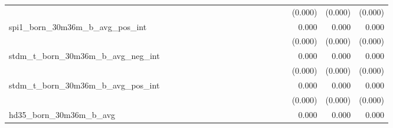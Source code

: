 \begin{tabular}{lrrrrrrrrrrrrrrrrrr}
                                            &              &              &              &              &              &              &              &              &               &              &              &               &              &              &               &      (0.000) &      (0.000) &       (0.000) \\ 
spi1\_born\_30m36m\_b\_avg\_pos\_int        &              &              &              &              &              &              &              &              &               &              &              &               &              &              &               &        0.000 &        0.000 &         0.000 \\ 
                                            &              &              &              &              &              &              &              &              &               &              &              &               &              &              &               &      (0.000) &      (0.000) &       (0.000) \\ 
stdm\_t\_born\_30m36m\_b\_avg\_neg\_int     &              &              &              &              &              &              &              &              &               &              &              &               &              &              &               &        0.000 &        0.000 &         0.000 \\ 
                                            &              &              &              &              &              &              &              &              &               &              &              &               &              &              &               &      (0.000) &      (0.000) &       (0.000) \\ 
stdm\_t\_born\_30m36m\_b\_avg\_pos\_int     &              &              &              &              &              &              &              &              &               &              &              &               &              &              &               &        0.000 &        0.000 &         0.000 \\ 
                                            &              &              &              &              &              &              &              &              &               &              &              &               &              &              &               &      (0.000) &      (0.000) &       (0.000) \\ 
hd35\_born\_30m36m\_b\_avg                  &              &              &              &              &              &              &              &              &               &              &              &               &              &              &               &        0.000 &        0.000 &         0.000 \\ 

\end{tabular}
